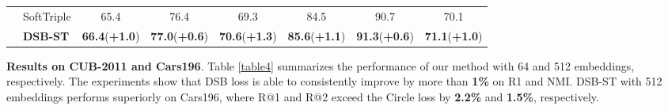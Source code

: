 \documentclass[10pt]{article} %
\begin{document}
\begin{table}[h]
\begin{tabular}{l|l| ccc| ccc }
                                & SoftTriple   & 65.4   &76.4   & 69.3   &84.5   & 90.7  & 70.1   \\
         & \textbf{DSB-ST}  & \textbf{66.4}(\textcolor[RGB]{0,201,87}{\textbf{+1.0}})   &\textbf{77.0}(\textbf{+0.6})  & \textbf{70.6}(\textcolor[RGB]{0,201,87}{\textbf{+1.3}})   &\textbf{85.6}(\textcolor[RGB]{0,201,87}{\textbf{+1.1}})   & \textbf{91.3}(\textbf{+0.6})  & \textbf{71.1}(\textcolor[RGB]{0,201,87}{\textbf{+1.0}})  \\
         \bottomrule \hline
 \end{tabular}
 \vskip -0.05in
\end{table}

\textbf{Results on CUB-2011 and Cars196}. Table \ref{table4} summarizes the performance of our method with 64 and 512 embeddings, respectively. The experiments show that DSB loss is able to consistently improve by more than \textbf{1\%} on R1 and NMI. DSB-ST with 512 embeddings performs superiorly on Cars196, where R@1 and R@2 exceed the Circle loss \cite {paper43} by \textbf{2.2\%} and \textbf{1.5\%}, respectively.  
\end{document}
